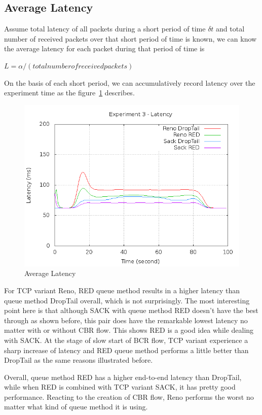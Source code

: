 \documentclass[10pt, conference]{lib/IEEEtran}
\begin{document}
\subsection{Average Latency}
Assume total latency of all packets during a short period of time $\delta t$ and total number of received packets over that short period of time is known, we can know the average latency for each packet during that period of time is 
\begin{center}
    $L = α / (total number of received packets)$
\end{center}
On the basis of each short period, we can accumulatively record latency over the experiment time as the figure~\ref{fig:exp3-lt} describes.
\begin{figure}[!htb]
    \centering
    \includegraphics[width=1.0\linewidth]{plot/exp3-lt.png}
    \caption{Average Latency}
    \label{fig:exp3-lt}
\end{figure}
For TCP variant Reno, RED queue method results in a higher latency 
than queue method DropTail overall, which is not surprisingly. The 
most interesting point here is that although SACK with queue method 
RED doesn’t have the best through as shown before, this pair does have 
the remarkable lowest latency no matter with or without CBR flow. This 
shows RED is a good idea while dealing with SACK. At the stage of slow 
start of BCR flow, TCP variant experience a sharp increase of latency 
and RED queue method performs a little better than DropTail as the 
same reasons illustrated before.

Overall, queue method RED has a higher end-to-end latency than 
DropTail, while when RED is combined with TCP variant SACK, it has 
pretty good performance. Reacting to the creation of CBR flow, Reno performs the worst no matter what kind of queue method it is using.
\end{document}
